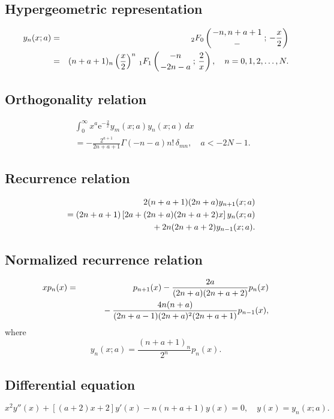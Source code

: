 \documentclass[envcountchap,graybox]{svmono}
\newcommand{\hyp}[5]{\mbox{}_{#1}{F}_{#2}
\left(\genfrac{}{}{0pt}{}{#3}{#4}\,;\,#5\right)}
\newcommand{\mathindent}{\hspace{7.5mm}}
\newcommand{\e}{\textrm{e}}
\renewcommand{\Gamma}{\varGamma}
\newcommand{\hyp}[5]{\,\mbox{}_{#1}F_{#2}\!\left(
  \genfrac{}{}{0pt}{}{#3}{#4};#5\right)}
\begin{document}
\par\setcounter{equation}{0}

\subsection*{Hypergeometric representation}
\begin{eqnarray}
\label{DefBessel}
y_n(x;a)&=&\hyp{2}{0}{-n,n+a+1}{-}{-\frac{x}{2}}\\
&=&(n+a+1)_n\left(\frac{x}{2}\right)^n\,\hyp{1}{1}{-n}{-2n-a}{\frac{2}{x}},
\quad n=0,1,2,\ldots,N.\nonumber
\end{eqnarray}

\subsection*{Orthogonality relation}
\begin{eqnarray}
\label{OrtBessel}
& &\int_0^{\infty}x^a\e^{-\frac{2}{x}}y_m(x;a)y_n(x;a)\,dx\nonumber\\
& &=-\frac{2^{a+1}}{2n+a+1}\Gamma(-n-a)n!\,\delta_{mn},\quad a<-2N-1.
\end{eqnarray}

\subsection*{Recurrence relation}
\begin{eqnarray}
\label{RecBessel}
& &2(n+a+1)(2n+a)y_{n+1}(x;a)\nonumber\\
& &{}=(2n+a+1)\left[2a+(2n+a)(2n+a+2)x\right]y_n(x;a)\nonumber\\
& &{}\mathindent{}+2n(2n+a+2)y_{n-1}(x;a).
\end{eqnarray}

\subsection*{Normalized recurrence relation}
\begin{eqnarray}
\label{NormRecBessel}
xp_n(x)&=&p_{n+1}(x)-\frac{2a}{(2n+a)(2n+a+2)}p_n(x)\nonumber\\
& &{}\mathindent{}-\frac{4n(n+a)}{(2n+a-1)(2n+a)^2(2n+a+1)}p_{n-1}(x),
\end{eqnarray}
where
$$y_n(x;a)=\frac{(n+a+1)_n}{2^n}p_n(x).$$

\subsection*{Differential equation}
\begin{equation}
\label{dvBessel}
x^2y''(x)+\left[(a+2)x+2\right]y'(x)-n(n+a+1)y(x)=0,\quad y(x)=y_n(x;a).
\end{equation}
\end{document}
